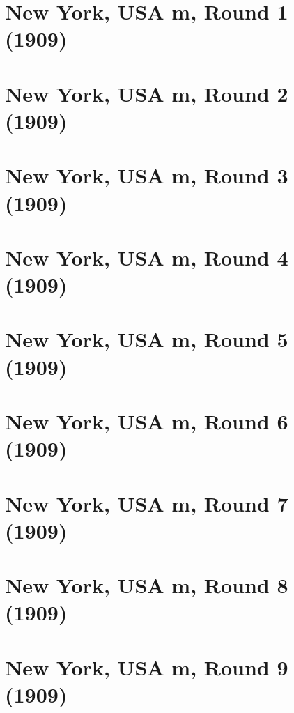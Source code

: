\documentclass[11pt]{article}
\begin{document}
\section{New York, USA m, Round 1 (1909)}


\clearpage

\section{New York, USA m, Round 2 (1909)}


\clearpage

\section{New York, USA m, Round 3 (1909)}


\clearpage

\section{New York, USA m, Round 4 (1909)}


\clearpage

\section{New York, USA m, Round 5 (1909)}


\clearpage

\section{New York, USA m, Round 6 (1909)}


\clearpage

\section{New York, USA m, Round 7 (1909)}


\clearpage

\section{New York, USA m, Round 8 (1909)}


\clearpage

\section{New York, USA m, Round 9 (1909)}

\end{document}
